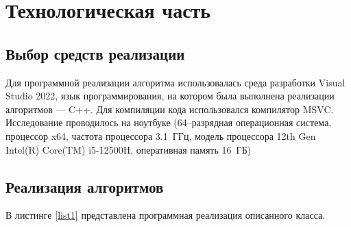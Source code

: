 \chapter{Технологическая часть}

\section{Выбор средств реализации}
Для программной реализации алгоритма использовалась среда разработки Visual Studio 2022, язык программирования, на котором была выполнена реализации алгоритмов --- C++.
Для компиляции кода использовался компилятор MSVC. Исследование проводилось на ноутбуке (64--разрядная операционная система, процессор x64, частота процессора 3.1~ГГц, модель процессора 12th Gen Intel(R) Core(TM) i5-12500H, оперативная память 16~ГБ)
\section{Реализация алгоритмов}
В листинге \ref{list1} представлена программная реализация описанного класса.

